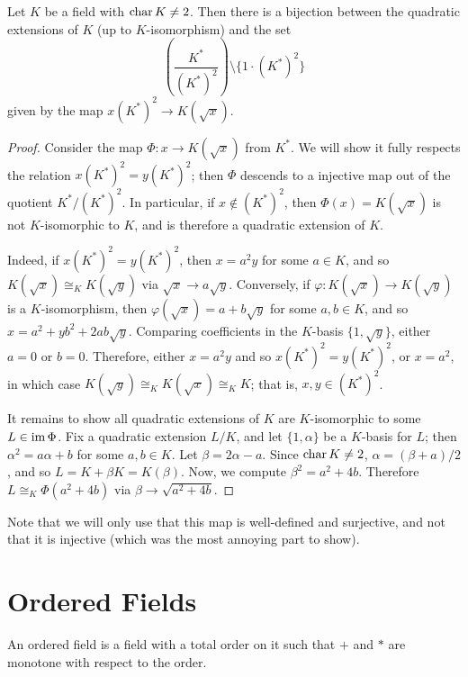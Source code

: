 \begin{lemma}
  \label{lem:deg_2_classify}
  Let $K$ be a field with $\operatorname{char} K\neq2$. Then there is a bijection between the quadratic extensions of $K$ (up to $K$-isomorphism) and the set
  \[\left(\frac{K^*}{{(K^*)^2}}\right)\setminus\{1\cdot(K^*)^2\}\]
  given by the map $x(K^*)^2\to K(\sqrt{x})$.
\end{lemma}
\begin{proof}
  Consider the map $\Phi:x\to K(\sqrt{x})$ from $K^*$. We will show it fully respects the relation $x(K^*)^2=y(K^*)^2$; then $\Phi$ descends to a injective map out of the quotient $K^*/(K^*)^2$. In particular, if $x\notin(K^*)^2$, then $\Phi(x)=K(\sqrt{x})$ is not $K$-isomorphic to $K$, and is therefore a quadratic extension of $K$.

  Indeed, if $x(K^*)^2=y(K^*)^2$, then $x=a^2y$ for some $a\in K$, and so $K(\sqrt{x})\cong_K K(\sqrt{y})$ via $\sqrt{x}\to a\sqrt{y}$. Conversely, if $\varphi:K(\sqrt{x})\to K(\sqrt{y})$ is a $K$-isomorphism, then $\varphi(\sqrt{x})=a+b\sqrt{y}$ for some $a,b\in K$, and so $x=a^2+yb^2+2ab\sqrt{y}$. Comparing coefficients in the $K$-basis $\{1,\sqrt{y}\}$, either $a=0$ or $b=0$. Therefore, either $x=a^2y$ and so $x(K^*)^2=y(K^*)^2$, or $x=a^2$, in which case $K(\sqrt{y})\cong_K K(\sqrt{x})\cong_K K$; that is, $x,y\in(K^*)^2$.

  It remains to show all quadratic extensions of $K$ are $K$-isomorphic to some $L\in\operatorname{im}\Phi$. Fix a quadratic extension $L/K$, and let $\{1,\alpha\}$ be a $K$-basis for $L$; then $\alpha^2=a\alpha+b$ for some $a,b\in K$. Let $\beta=2\alpha-a$. Since $\operatorname{char} K\neq 2$, $\alpha=(\beta+a)/2$, and so $L=K+\beta K=K(\beta)$. Now, we compute $\beta^2=a^2+4b$. Therefore $L\cong_K\Phi(a^2+4b)$ via $\beta\to\sqrt{a^2+4b}$.
\end{proof}

Note that we will only use that this map is well-defined and surjective, and not that it is injective (which was the most annoying part to show).

\section{Ordered Fields}

\begin{definition}
  \label{def:ordered_field}
  \leanok
  An ordered field is a field with a total order on it such that $+$ and $*$ are monotone with respect to the order.
\end{definition}

